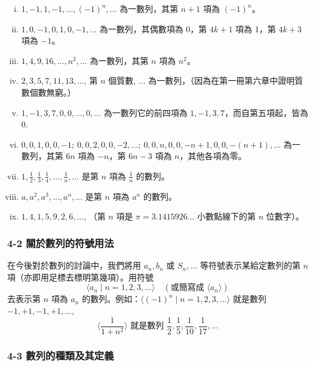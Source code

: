 \begin{example}\label{ex:b2_2-4-3}
\leavevmode
\begin{enumerate}[(i)]
    \item $1, -1, 1, -1, \dots, (-1)^n, \dots$ 為一數列，其第 $n+1$ 項為 $(-1)^n$。
    \item $1, 0, -1, 0, 1, 0, -1, \dots$ 為一數列，其偶數項為 0，第 $4k+1$ 項為 1，第 $4k+3$ 項為 $-1$。
    \item $1, 4, 9, 16, \dots, n^2, \dots$ 為一數列，其第 $n$ 項為 $n^2$。
    \item $2, 3, 5, 7, 11, 13, \dots$, 第 $n$ 個質數, $\dots$ 為一數列，（因為在第一冊第六章中證明質數個數無窮。）
    \item $1, -1, 3, 7, 0, 0, \dots, 0, \dots$ 為一數列它的前四項為 $1, -1, 3, 7$，而自第五項起，皆為 0.
    \item $0, 0, 1, 0, 0, -1;\ 0, 0, 2, 0, 0, -2, \dots;\ 0, 0, n, 0, 0, -n+1, 0, 0, -(n+1), \dots$\label{note:b2-ch2-p40-ex3-vi} 為一數列，其第 $6n$ 項為 $-n$，第 $6n-3$ 項為 $n$，其他各項為零。
    \item $1, \frac{1}{2}, \frac{1}{3}, \frac{1}{4}, \dots, \frac{1}{n}, \dots$ 是第 $n$ 項為 $\frac{1}{n}$ 的數列。
    \item $a, a^2, a^3, \dots, a^n, \dots$ 是第 $n$ 項為 $a^n$ 的數列。
    \item $1, 4, 1, 5, 9, 2, 6, \dots$, （第 $n$ 項是 $\pi=3.1415926\dots$ 小數點線下的第 $n$ 位數字）。
\end{enumerate}
\end{example}

\subsubsection*{4-2 關於數列的符號用法}

在今後對於數列的討論中，我們將用 $a_n, b_n$ 或 $S_n, \dots$ 等符號表示某給定數列的第 $n$ 項（亦即用足標去標明第幾項）。用符號
\[
\langle a_n \mid n=1, 2, 3, \dots \rangle \quad (\text{或簡寫成 } \langle a_n \rangle)
\]
去表示第 $n$ 項為 $a_n$ 的數列。例如：$\langle (-1)^n \mid n=1, 2, 3, \dots \rangle$ 就是數列 $-1, +1, -1, +1, \dots$,
\[
\langle \frac{1}{1+n^2} \rangle \text{ 就是數列 } \frac{1}{2}, \frac{1}{5}, \frac{1}{10}, \frac{1}{17}, \dots
\]

\subsubsection*{4-3 數列的種類及其定義}

